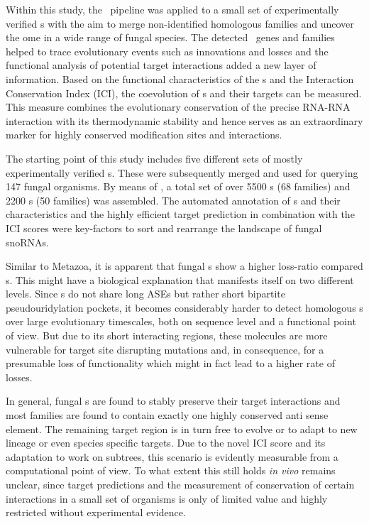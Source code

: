Within this study, the \snostrip\ pipeline was applied to a small set of
experimentally verified \sno s with the aim to merge non-identified
homologous families and uncover the \sno ome in a wide range of fungal
species. The detected \sno\ genes and families helped to trace
evolutionary events such as innovations and losses and the functional
analysis of potential target interactions added a new layer of information.
Based on the functional characteristics of the \sno s and the
Interaction Conservation Index (ICI), the coevolution of \sno s and
their targets can be measured. This measure combines the evolutionary
conservation of the precise RNA-RNA interaction with its thermodynamic
stability and hence serves as an extraordinary marker for highly
conserved modification sites and interactions.

The starting point of this study includes five different sets of mostly experimentally
verified \sno s. These were subsequently merged and used for querying
147 fungal organisms. By means of \snostrip, a total set of over 5500 \cd s (68 families)
and 2200 \haca s (50 families) was assembled. The automated
annotation of \sno s and their characteristics and the highly efficient
target prediction in combination with the ICI scores were key-factors
to sort and rearrange the landscape of fungal snoRNAs.

Similar to Metazoa, it is apparent that fungal \haca s show a higher
loss-ratio compared \cd s. This might have a biological explanation
that manifests itself on two different levels. Since \haca s do not share
long ASEs but rather short bipartite pseudouridylation pockets, it
becomes considerably harder to detect homologous \sno s over large
evolutionary timescales, both on sequence level and a functional point
of view. But due to its short interacting regions, these molecules are
more vulnerable for target site disrupting mutations and, in
consequence, for a presumable loss of functionality which might in
fact lead to a higher rate of losses.

In general, fungal \sno s are found to stably preserve their target
interactions and most families are found to contain exactly one
highly conserved anti sense element. The remaining target region is
in turn free to evolve or to adapt to new lineage or even species
specific targets. Due to the novel ICI score and its adaptation to
work on subtrees, this scenario is
evidently measurable from a computational point of view. To what
extent this still holds \textit{in vivo} remains unclear, since target
predictions and the measurement of conservation of certain
interactions in a small set of organisms is only of limited value and highly restricted
without experimental evidence.

